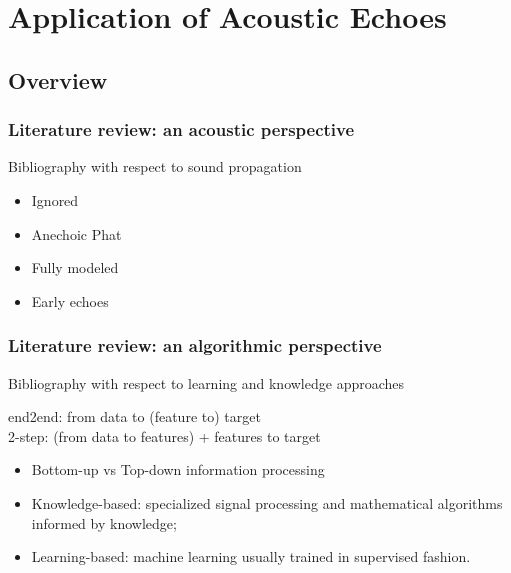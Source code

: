 \chapter{Application of Acoustic Echoes}\label{chap:application}

 \blindtext

\section{Overview}


\subsection{Literature review: an acoustic perspective}
Bibliography with respect to sound propagation
\begin{itemize}
    \item Ignored
    \item Anechoic Phat
    \item Fully modeled
    \item Early echoes
\end{itemize}

\subsection{Literature review: an algorithmic perspective}\cite{subsec:application:algos}
Bibliography with respect to learning and knowledge approaches




end2end: from data to (feature to) target
\\2-step: (from data to features) + features to target

\begin{itemize}
    \item Bottom-up vs Top-down information processing
    \item Knowledge-based: specialized signal processing and mathematical algorithms informed by knowledge;
    \item Learning-based: machine learning usually trained in supervised fashion.
\end{itemize}



